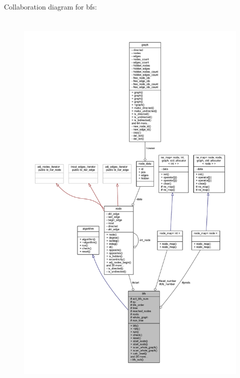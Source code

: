 Collaboration diagram for bfs\+:\nopagebreak
\begin{figure}[H]
\begin{center}
\leavevmode
\includegraphics[height=550pt]{classbfs__coll__graph}
\end{center}
\end{figure}
